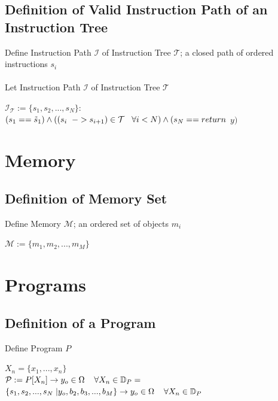 \documentclass[11pt]{article}
\begin{document}
\subsection{Definition of Valid Instruction Path of an Instruction Tree}
Define Instruction Path $\mathcal{I}$ of Instruction Tree $\mathcal{T}$; a closed path of ordered instructions $s_i$\\ \\
Let  Instruction Path $\mathcal{I}$ of Instruction Tree $\mathcal{T}$
\begin{center}
$
\mathcal{I}_{\mathcal{T}}:= \{ s_1,s_2,...,s_{N}\} :
$
\\ \vspace{2mm}
$
(s_1 == \tilde{s}_1)  \land ((s_i \hspace{2mm} -> s_{i+1}) \in \mathcal{T} \hspace{3mm} \forall i < N) \land (s_N == return$ $y)
$
\end{center}



\section{Memory}
\subsection{Definition of Memory Set}
Define Memory $\mathcal{M}$; an ordered set of objects $m_i$
\begin{center}
$\mathcal{M} := \{m_1,m_2,...,m_M\}$
\end{center}



\section{Programs}
\subsection{Definition of a Program}
Define Program $P$
\begin{center}
$
X_n = \{x_1,...,x_n\}
$
\\ \vspace{4mm}
$\mathcal{P} := P\lbrack X_n \rbrack \rightarrow y_o \in \Omega \hspace{4mm} \forall X_n \in \mathbb{D}_{P} =$
\\ \vspace{2mm}
$
\{ s_1,s_2,...,s_{N}\hspace{1mm}| y_o, b_2, b_3,...,b_M\} \rightarrow y_o \in \Omega \hspace{4mm} \forall X_n \in \mathbb{D}_{P}
$
\end{center}
\end{document}
